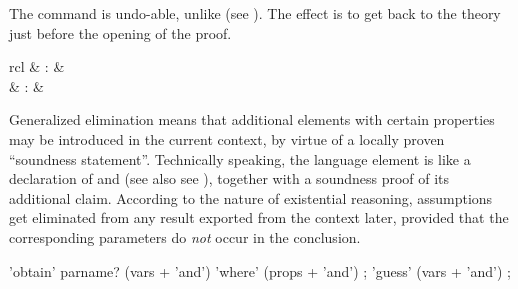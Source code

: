 \begin{isabellebody}
\begin{isamarkuptext}
  \medskip The \hyperlink{command.oops}{\mbox{}} command is undo-able, unlike
  \hyperlink{command.kill}{\mbox{}} (see ).  The effect is to
  get back to the theory just before the opening of the proof.%
\end{isamarkuptext}%
\isamarkuptrue%
%
\isamarkuptrue%
%
\begin{isamarkuptext}%
\begin{matharray}{rcl}
    \hypertarget{command.obtain}{\hyperlink{command.obtain}{\mbox{}}} & : &  \\
    \hypertarget{command.guess}{\hyperlink{command.guess}{\mbox{}}}\isa{{\isachardoublequote}\isactrlsup {\isacharasterisk}{\isachardoublequote}} & : &  \\
  \end{matharray}

  Generalized elimination means that additional elements with certain
  properties may be introduced in the current context, by virtue of a
  locally proven ``soundness statement''.  Technically speaking, the
  \hyperlink{command.obtain}{\mbox{}} language element is like a declaration of
  \hyperlink{command.fix}{\mbox{}} and \hyperlink{command.assume}{\mbox{}} (see also see
  ), together with a soundness proof of its
  additional claim.  According to the nature of existential reasoning,
  assumptions get eliminated from any result exported from the context
  later, provided that the corresponding parameters do \emph{not}
  occur in the conclusion.

  \begin{rail}
    'obtain' parname? (vars + 'and') 'where' (props + 'and')
    ;
    'guess' (vars + 'and')
    ;
  \end{rail}


\end{isamarkuptext}
\end{isabellebody}
